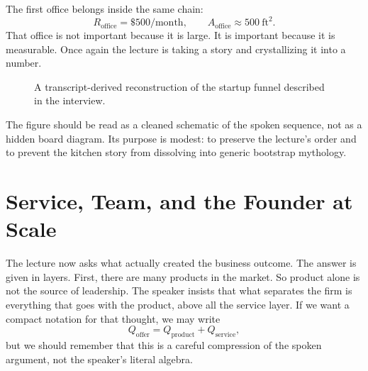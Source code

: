 The first office belongs inside the same chain:
\begin{equation}
R_{\text{office}} = \$500/\text{month}, \qquad A_{\text{office}} \approx 500\ \text{ft}^2.
\end{equation}
That office is not important because it is large. It is important because it is measurable. Once again the lecture is taking a story and crystallizing it into a number.

\begin{figure}
\centering
{}
\caption{A transcript-derived reconstruction of the startup funnel described in the interview.}
\end{figure}

The figure should be read as a cleaned schematic of the spoken sequence, not as a hidden board diagram. Its purpose is modest: to preserve the lecture’s order and to prevent the kitchen story from dissolving into generic bootstrap mythology.

\section{Service, Team, and the Founder at Scale}

The lecture now asks what actually created the business outcome. The answer is given in layers. First, there are many products in the market. So product alone is not the source of leadership. The speaker insists that what separates the firm is everything that goes with the product, above all the service layer. If we want a compact notation for that thought, we may write
\begin{equation}
Q_{\text{offer}} = Q_{\text{product}} + Q_{\text{service}},
\end{equation}
but we should remember that this is a careful compression of the spoken argument, not the speaker’s literal algebra.

